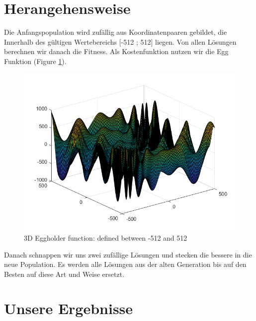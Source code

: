 \documentclass{hbrs-ecta-report}
\begin{document}
\section{Herangehensweise}
Die Anfangspopulation wird zufällig aus Koordinatenpaaren gebildet, die Innerhalb des gültigen Wertebereichs [-512 ; 512] liegen. Von allen Lösungen berechnen wir danach die Fitness. Als Kostenfunktion nutzen wir die Egg Funktion (Figure \ref{fig:egg}). 

\begin{figure}[h!]
	\includegraphics[width=\linewidth]{img/egg}
	\caption{3D Eggholder function: defined between -512 and 512}
	\label{fig:egg}
\end{figure}
Danach schnappen wir uns zwei zufällige Lösungen und stecken die bessere in die neue Population. Es werden alle Lösungen aus der alten Generation bis auf den Besten auf diese Art und Weise ersetzt.


\section{Unsere Ergebnisse}
\end{document}
